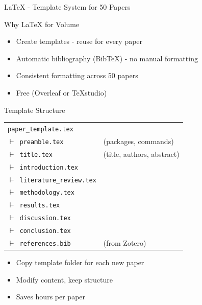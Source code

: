 \documentclass[11pt]{beamer}
\begin{document}
\begin{frame}{LaTeX - Template System for 50 Papers}
	\scriptsize
	\begin{block}{Why LaTeX for Volume}
		\begin{itemize}
			\item Create templates - reuse for every paper
			\item Automatic bibliography (BibTeX) - no manual formatting
			\item Consistent formatting across 50 papers
			\item Free (Overleaf or TeXstudio)
		\end{itemize}
	\end{block}
	\begin{block}{Template Structure}
		\centering
		\begin{tabular}{ll}
			\multicolumn{2}{l}{\texttt{paper\_template.tex}} \\
			\texttt{$\vdash$ preamble.tex} & (packages, commands) \\
			\texttt{$\vdash$ title.tex} & (title, authors, abstract) \\
			\texttt{$\vdash$ introduction.tex} & \\
			\texttt{$\vdash$ literature\_review.tex} & \\
			\texttt{$\vdash$ methodology.tex} & \\
			\texttt{$\vdash$ results.tex} & \\
			\texttt{$\vdash$ discussion.tex} & \\
			\texttt{$\vdash$ conclusion.tex} & \\
			\texttt{$\vdash$ references.bib} & (from Zotero) \\
		\end{tabular}
	\end{block}
	\begin{itemize}
		\item Copy template folder for each new paper
		\item Modify content, keep structure
		\item Saves hours per paper
	\end{itemize}
\end{frame}
	
\end{document}
